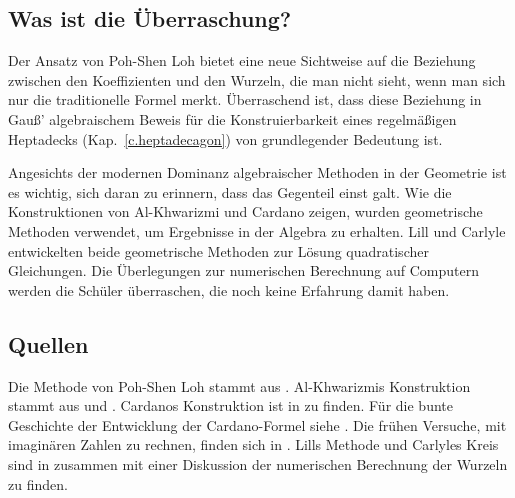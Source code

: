 \subsection*{Was ist die Überraschung?}

Der Ansatz von Poh-Shen Loh bietet eine neue Sichtweise auf die Beziehung zwischen den Koeffizienten und den Wurzeln, die man nicht sieht, wenn man sich nur die traditionelle Formel merkt. Überraschend ist, dass diese Beziehung in Gauß' algebraischem Beweis für die Konstruierbarkeit eines regelmäßigen Heptadecks (Kap.~\ref{c.heptadecagon}) von grundlegender Bedeutung ist.

Angesichts der modernen Dominanz algebraischer Methoden in der Geometrie ist es wichtig, sich daran zu erinnern, dass das Gegenteil einst galt. Wie die Konstruktionen von Al-Khwarizmi und Cardano zeigen, wurden geometrische Methoden verwendet, um Ergebnisse in der Algebra zu erhalten. Lill und Carlyle entwickelten beide geometrische Methoden zur Lösung quadratischer Gleichungen. Die Überlegungen zur numerischen Berechnung auf Computern werden die Schüler überraschen, die noch keine Erfahrung damit haben.

\subsection*{Quellen}
Die Methode von Poh-Shen Loh stammt aus \cite{loh1,loh2}. Al-Khwarizmis Konstruktion stammt aus \cite[Chapter~1]{jorg} und \cite{mastin}. Cardanos Konstruktion ist in \cite[Kap.~1]{jorg} zu finden. Für die bunte Geschichte der Entwicklung der Cardano-Formel siehe \cite{wiki:cardano}. Die frühen Versuche, mit imaginären Zahlen zu rechnen, finden sich in \cite[Chapter~2]{jorg}. Lills Methode und Carlyles Kreis sind in \cite{wiki:quad} zusammen mit einer Diskussion der numerischen Berechnung der Wurzeln zu finden.
